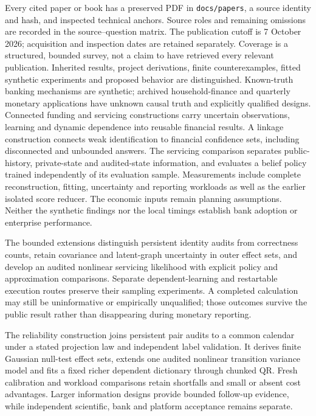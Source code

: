 \documentclass[11pt,a4paper,openany]{book}
\begin{document}
Every cited paper or book has a preserved PDF in \texttt{docs/papers}, a
source identity and hash, and inspected technical anchors. Source roles and
remaining omissions are recorded in the source--question matrix. The
publication cutoff is 7 October 2026; acquisition and inspection dates
are retained separately. Coverage is a structured, bounded survey, not a
claim to have retrieved every relevant publication. Inherited results,
project derivations, finite counterexamples, fitted synthetic experiments
and proposed behavior are distinguished. Known-truth banking mechanisms are
synthetic; archived household-finance and quarterly monetary applications
have unknown causal truth and explicitly qualified designs. Connected funding
and servicing constructions carry uncertain observations, learning and
dynamic dependence into reusable financial results. A linkage construction connects weak identification to
financial confidence sets, including disconnected and unbounded answers.
The servicing comparison
separates public-history, private-state and audited-state information, and
evaluates a belief policy trained independently of its evaluation sample. Measurements include complete reconstruction, fitting,
uncertainty and reporting workloads as well as the earlier isolated score
reducer. The economic inputs remain planning assumptions. Neither the
synthetic findings nor the local timings establish bank adoption or
enterprise performance.

The bounded extensions distinguish persistent identity audits from correctness
counts, retain covariance and latent-graph uncertainty in outer effect sets,
and develop an audited nonlinear servicing likelihood with explicit policy
and approximation comparisons. Separate dependent-learning and restartable
execution routes preserve their sampling experiments. A completed calculation
may still be uninformative or empirically unqualified; those outcomes survive
the public result rather than disappearing during monetary reporting.

The reliability construction joins persistent pair audits to a common calendar
under a stated projection law and independent label validation. It derives
finite Gaussian null-test effect sets, extends one audited nonlinear transition
variance model and fits a fixed richer dependent dictionary through chunked QR.
Fresh calibration and workload comparisons retain shortfalls and small or absent
cost advantages. Larger information designs provide bounded follow-up evidence,
while independent scientific, bank and platform acceptance remains separate.
\end{document}
